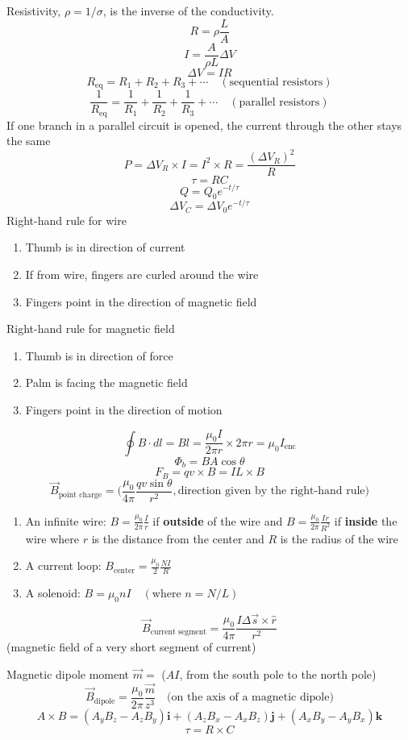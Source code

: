 \documentclass[twocolumn]{article}
\begin{document}
Resistivity, $\rho = 1/\sigma$, is the inverse of the conductivity.
\[R=\rho \frac{L}{A}\]
\[I=\frac{A}{\rho L}\Delta V\]
\[\Delta V = IR\]
\[R_\text{eq}=R_1 + R_2 + R_3 + \cdots\quad (\text{sequential resistors})\]
\[\frac{1}{R_\text{eq}}=\frac{1}{R_1} + \frac{1}{R_2} + \frac{1}{R_3} + \cdots\quad
(\text{parallel resistors})\]
If one branch in a parallel circuit is opened, the current through the other stays the same
\[P=\Delta V_R\times I = I^2\times R = \frac{{(\Delta V_R)}^2}{R}\]
\[\tau = RC\]
\[Q=Q_0 e^{-t/\tau}\]
\[\Delta V_C=\Delta V_0 e^{-t/\tau}\]
Right-hand rule for wire
\begin{enumerate}
    \item Thumb is in direction of current
    \item If from wire, fingers are curled around the wire
    \item Fingers point in the direction of magnetic field
\end{enumerate}
Right-hand rule for magnetic field
\begin{enumerate}
    \item Thumb is in direction of force
    \item Palm is facing the magnetic field
    \item Fingers point in the direction of motion
\end{enumerate}
\[\oint B\cdot dl = Bl = \frac{\mu_0 I}{2\pi r}\times 2\pi r = \mu_0 I_\text{enc}\]
\[\Phi_b = BA\cos\theta\]
\[F_B=qv\times B=IL\times B\]
\[\vec{B}_\text{point charge}=\Big(\frac{\mu_0}{4\pi}\frac{qv\sin \theta}{r^2},
\text{direction given by the right-hand rule}\Big)\]
\begin{enumerate}
    \item An infinite wire: $B=\frac{\mu_0}{2\pi}\frac{I}{r}$ if \textbf{outside} of the wire and
    $B=\frac{\mu_0}{2\pi}\frac{Ir}{R^2}$ if \textbf{inside} the wire where $r$ is the distance from
    the center and $R$ is the radius of the wire
    \item A current loop: $B_\text{center}=\frac{\mu_0}{2}\frac{NI}{R}$
    \item A solenoid: $B=\mu_0 nI\quad(\text{where }n=N/L)$
\end{enumerate}

\[\vec{B}_\text{current segment}=\frac{\mu_0}{4\pi}\frac{I\Delta \vec{s}\times \hat{r}}{r^2}\]
\quad(magnetic field of a very short segment of current)
\vspace{1em}

Magnetic dipole moment $\vec{m}=$ ($AI$, from the south pole to the north pole)
\[\vec{B}_\text{dipole}=\frac{\mu_0}{2\pi}\frac{\vec{m}}{z^3}\quad
\text{(on the axis of a magnetic dipole)}\]
\[A\times B = (A_y B_z - A_z B_y)\mathbf{i}+(A_z B_x-A_x B_z)\mathbf{j}+(A_x B_y-A_y B_x)\mathbf{k}\]
\[\tau = R\times C\]
\end{document}
